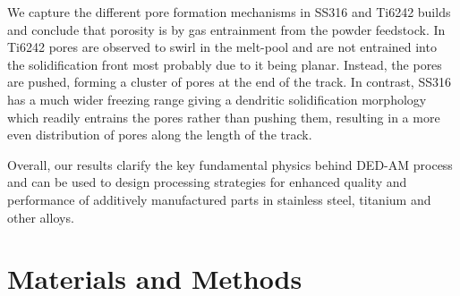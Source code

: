 \documentclass[10pt]{article}
\begin{document}
We capture the different pore formation mechanisms in SS316 and Ti6242 builds and conclude that porosity is by gas entrainment from the powder feedstock. In Ti6242 pores are observed to swirl in the melt-pool and are not entrained into the solidification front most probably due to it being planar. Instead, the pores are pushed, forming a cluster of pores at the end of the track. In contrast, SS316 has a much wider freezing range giving a dendritic solidification morphology which readily entrains the pores rather than pushing them, resulting in a more even distribution of pores along the length of the track.

Overall, our results clarify the key fundamental physics behind DED-AM process and can be used to design processing strategies for enhanced quality and performance of additively manufactured parts in stainless steel, titanium and other alloys.

\section*{Materials and Methods}
\end{document}
